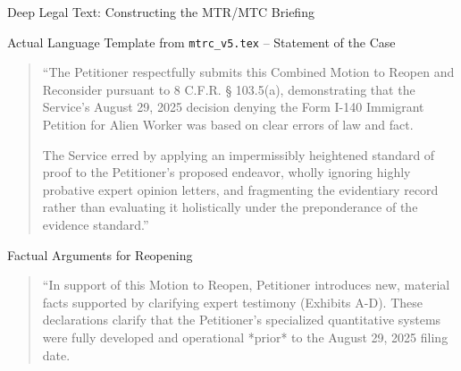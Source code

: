 \documentclass[11pt]{beamer}
\begin{document}
	
	\begin{frame}[allowframebreaks]{Deep Legal Text: Constructing the MTR/MTC Briefing}
		\scriptsize
		\begin{block}{Actual Language Template from \texttt{mtrc\_v5.tex} -- Statement of the Case}
			\begin{quote}
				``The Petitioner respectfully submits this Combined Motion to Reopen and Reconsider pursuant to 8 C.F.R. § 103.5(a), demonstrating that the Service's August 29, 2025 decision denying the Form I-140 Immigrant Petition for Alien Worker was based on clear errors of law and fact. 
				
				The Service erred by applying an impermissibly heightened standard of proof to the Petitioner's proposed endeavor, wholly ignoring highly probative expert opinion letters, and fragmenting the evidentiary record rather than evaluating it holistically under the preponderance of the evidence standard.''
			\end{quote}
		\end{block}
		\framebreak
		\begin{block}{Factual Arguments for Reopening}
			\begin{quote}
				``In support of this Motion to Reopen, Petitioner introduces new, material facts supported by clarifying expert testimony (Exhibits A-D). These declarations clarify that the Petitioner's specialized quantitative systems were fully developed and operational *prior* to the August 29, 2025 filing date. 
				

\end{quote}
\end{block}
\end{frame}
\end{document}
